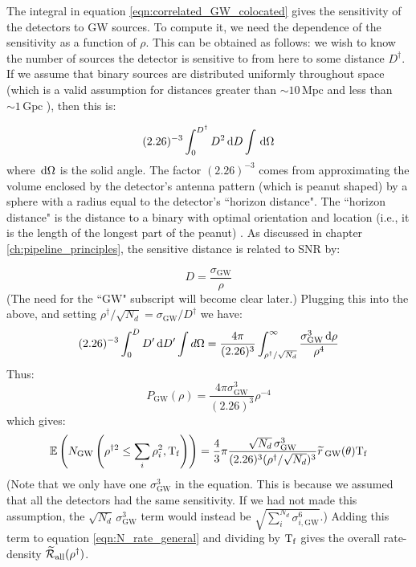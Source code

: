 The integral in equation \ref{eqn:correlated_GW_colocated} gives the sensitivity of the detectors to \ac{GW} sources. To compute it, we need the dependence of the sensitivity as a function of $\rho$. This can be obtained as follows: we wish to know the number of sources the detector is sensitive to from here to some distance $D^\dagger$. If we assume that binary sources are distributed uniformly throughout space (which is a valid assumption for distances greater than $\sim10\,\mathrm{Mpc}$ and less than $\sim1\,\mathrm{Gpc}$ \cite{rates doc}), then this is:

\begin{equation}
(2.26)^{-3} \int_{0}^{D^\dagger} D^2 \,\mathrm{d} D \int \,\mathrm{d}\Omega
\end{equation}
where $\,\mathrm{d}\Omega$ is the solid angle. The factor $(2.26)^{-3}$ comes from approximating the volume enclosed by the detector's antenna pattern (which is peanut shaped) by a sphere with a radius equal to the detector's ``horizon distance". The ``horizon distance" is the distance to a binary with optimal orientation and location (i.e., it is the length of the longest part of the peanut) \cite{Finn and Chernoff}. As discussed in chapter \ref{ch:pipeline_principles}, the sensitive distance is related to \ac{SNR} by:

\begin{equation}
\label{eqn:DtoRho}
D = \frac{\sigma_{\mathrm{GW}}}{\rho}
\end{equation}
(The need for the ``$\mathrm{GW}$" subscript will become clear later.) Plugging this into the above, and setting $\rho^\dagger / \sqrt{N_d} = \sigma_{\mathrm{GW}} / D^\dagger$ we have:
\begin{equation}
(2.26)^{-3} \int_{0}^{D} D' \,\mathrm{d} D' \int d\Omega = \frac{4\pi}{(2.26)^3} \int_{\rho^\dagger/\sqrt{N_d}}^{\infty} \frac{\sigma_{\mathrm{GW}}^3 \,\mathrm{d}\rho}{\rho^4}
\end{equation}
Thus:
\begin{equation}
\label{eqn:GW_pdf}
P_{\mathrm{GW}}(\rho) = \frac{4\pi \sigma_{\mathrm{GW}}^3}{(2.26)^3} \rho^{-4}
\end{equation}
which gives:
\begin{equation}
\label{eqn:expectedN_GW}
\Exptd\left(N_{\mathrm{GW}} \left(\rho^{\dagger2} \leq  \sum_i\rho_i^2, \Tf \right) \right) = \frac{4}{3} \pi \frac{\sqrt{N_d}\, \sigma_{\mathrm{GW}}^3}{(2.26)^3 (\rho^\dagger/\sqrt{N_d})^3} \rsrc_{\mathrm{GW}}(\theta) \Tf 
\end{equation}
(Note that we only have one $\sigma_{\mathrm{GW}}^3$ in the equation. This is because we assumed that all the detectors had the same sensitivity. If we had not made this assumption, the $\sqrt{N_d}\,\sigma_{\mathrm{GW}}^3$ term would instead be $\sqrt{ \sum_i^{N_d} \sigma_{i,\mathrm{GW}}^6 }$.) Adding this term to equation \ref{eqn:N_rate_general} and dividing by $\mathrm{T_f}$ gives the overall rate-density $\widetilde{\mathcal{R}}_{\mathrm{all}}(\rho^\dagger)$.

